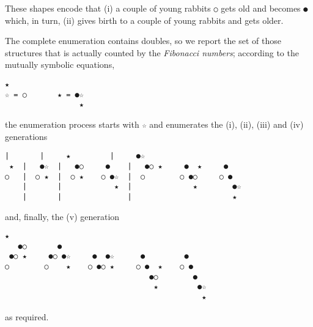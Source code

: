 \begin{example}[Rabbits] These shapes encode that (i) a couple of young rabbits
\verb|○| gets old and becomes \verb|●| which, in turn, (ii) gives birth to a
couple of young rabbits and gets older. 

\end{example}
The complete enumeration contains doubles, so we report the set of those
structures that is actually counted by the \textit{Fibonacci numbers};
according to the mutually symbolic equations,
\begin{Verbatim}[baselinestretch=0.5,fontsize=\footnotesize]
     ★
☆ = ○       ★ = ●☆
                 ★
\end{Verbatim}
the enumeration process starts with \verb|☆| and enumerates the (i), (ii),
(iii) and (iv) generations
\begin{Verbatim}[baselinestretch=0.5,fontsize=\footnotesize]
    |       |     ★         |     ●☆          
 ★  |   ●☆  |   ●○     ●    |   ●○ ★     ●  ★     ● 
○   |  ○ ★  |  ○ ★    ○ ●☆  |  ○        ○ ●○     ○ ●
    |       |            ★  |              ★        ●☆
    |       |               |                       ★
\end{Verbatim}
and, finally, the (v) generation
\begin{Verbatim}[baselinestretch=0.5,fontsize=\footnotesize]
     ★
   ●○       ●              
 ●○ ★     ●○ ●☆     ●  ●☆      ●         ●
○        ○    ★    ○ ●○ ★     ○ ●  ★    ○ ●
                                 ●○        ●
                                  ★         ●☆
                                             ★
\end{Verbatim}
as required.
